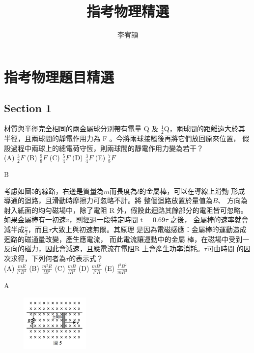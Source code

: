 \documentclass[cn,10pt,math=newtx,chinesefont=founder]{elegantbook}
\title{指考物理精選}
\author{李宥頡}
\begin{document}
\maketitle
\frontmatter
\mainmatter
\chapter{指考物理題目精選}
\section{Section 1}

\begin{example}
    材質與半徑完全相同的兩金屬球分別帶有電量 Q 及 $\frac{1}{2}$Q，兩球間的距離遠大於其半徑，且兩球間的靜電作用力為 F 。今將兩球接觸後再將它們放回原來位置，
    假設過程中兩球上的總電荷守恆，則兩球間的靜電作用力變為若干？\\
    (A) $\frac{3}{2}F$ (B) $\frac{9}{8}F$ (C) $\frac{5}{4}F$ (D) $\frac{3}{4}F$ (E) $\frac{7}{8}F$\\
    \rightline{[109補考]}
\end{example}
\begin{solution}
    B
\end{solution}    
\newpage

\begin{example}
    考慮如圖5的線路，右邊是質量為$m$而長度為$l$的金屬棒，可以在導線上滑動
    形成導通的迴路，且滑動時摩擦力可忽略不計。將 整個迴路放置於量值為$B$、
    方向為射入紙面的均勻磁場中，除了電阻 R 外，假設此迴路其餘部分的電阻皆可忽略。
    如果金屬棒有一初速$v$，則經過一段特定時間 t = 0.69$\tau$ 之後，
    金屬棒的速率就會減半成$\frac{v}{2}$，而且$\tau$大致上與初速無關。其原理
    是因為電磁感應：金屬棒的運動造成迴路的磁通量改變，產生應電流， 而此電流讓運動中的金屬
    棒，在磁場中受到一反向的磁力，因此會減速，且應電流在電阻R 上會產生功率消耗。$\tau$可由時間
    的因次求得，下列何者為$\tau$的表示式？\\
    (A) $\frac{mR}{l^2 B^2}$ (B) $\frac{m^2 R}{l B^2}$ (C) $\frac{mB}{l R^2}$ (D) $\frac{mB^2}{l^2 R}$ (E) $\frac{l^2 B^2}{m R^2}$\\
    \rightline{[109補考]}
\end{example}
\begin{solution}
    A
\end{solution}
\begin{figure}[htbp]
    \flushright
    \includegraphics[width=0.3\textwidth]{109_13.png}
\end{figure}
\newpage
\end{document}
